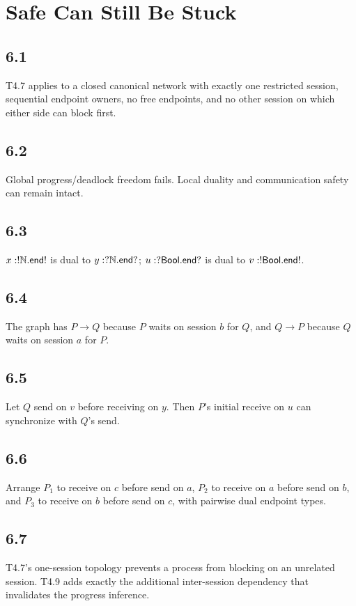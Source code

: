 \chapter{Safe Can Still Be Stuck}

\section*{6.1}
T4.7 applies to a closed canonical network with exactly one restricted session, sequential endpoint owners, no free endpoints, and no other session on which either side can block first.

\section*{6.2}
Global progress/deadlock freedom fails. Local duality and communication safety can remain intact.

\section*{6.3}
$x:!\mathbb{N}.\mathsf{end!}$ is dual to $y:?\mathbb{N}.\mathsf{end?}$; $u:?\mathsf{Bool}.\mathsf{end?}$ is dual to $v:!\mathsf{Bool}.\mathsf{end!}$.

\section*{6.4}
The graph has $P\to Q$ because $P$ waits on session $b$ for $Q$, and $Q\to P$ because $Q$ waits on session $a$ for $P$.

\section*{6.5}
Let $Q$ send on $v$ before receiving on $y$. Then $P$'s initial receive on $u$ can synchronize with $Q$'s send.

\section*{6.6}
Arrange $P_1$ to receive on $c$ before send on $a$, $P_2$ to receive on $a$ before send on $b$, and $P_3$ to receive on $b$ before send on $c$, with pairwise dual endpoint types.

\section*{6.7}
T4.7's one-session topology prevents a process from blocking on an unrelated session. T4.9 adds exactly the additional inter-session dependency that invalidates the progress inference.

